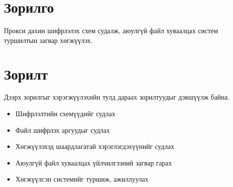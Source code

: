 \section*{Зорилго}
Прокси дахин шифрлэлэх схем судалж, аюулгүй файл хуваалцах систем туршилтын загвар хөгжүүлэх.

\section*{Зорилт}
Дээрх зорилгыг хэрэгжүүлэхийн тулд дараах зорилтуудыг дэвшүүлж байна.
\begin{itemize}
    \item Шифрлэлтийн схемүүдийг судлах
    \item Файл шифрлэх аргуудыг судлах
    \item Хөгжүүлэхэд шаардлагатай хэрэглэгдэхүүнийг судлах
    \item Аюулгүй файл хуваалцах үйлчилгээний загвар гарах
    \item Хөгжүүлсэн системийг туршиж, ажиллуулах
\end{itemize}

